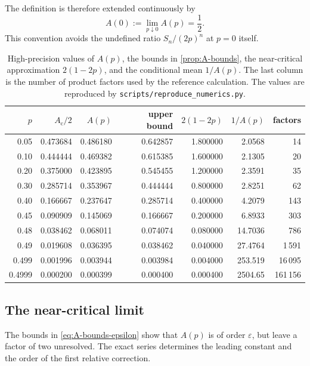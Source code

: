 The definition is therefore extended continuously by
\begin{equation}
  A(0):=\lim_{p\downarrow0}A(p)=\frac12.
  \label{eq:A-at-zero}
\end{equation}
This convention avoids the undefined ratio \(S_n/(2p)^n\) at \(p=0\) itself.

\begin{table}[htbp]
\centering
\caption{High-precision values of \(A(p)\), the bounds in
\cref{prop:A-bounds}, the near-critical approximation \(2(1-2p)\), and the
conditional mean \(1/A(p)\).  The last column is the number of product factors used
by the reference calculation.  The values are reproduced by
\texttt{scripts/reproduce\_numerics.py}.}
\label{tab:A-values}
\small
\setlength{\tabcolsep}{4.2pt}
\begin{tabular}{@{}rrrrrrr@{}}
\toprule
\(p\) & \(A_{\mathrm c}/2\) & \(A(p)\) & upper bound & \(2(1-2p)\) & \(1/A(p)\) & factors\\
\midrule
0.05   & 0.473684 & 0.486180 & 0.642857 & 1.800000 & 2.0568 & 14\\
0.10   & 0.444444 & 0.469382 & 0.615385 & 1.600000 & 2.1305 & 20\\
0.20   & 0.375000 & 0.423895 & 0.545455 & 1.200000 & 2.3591 & 35\\
0.30   & 0.285714 & 0.353967 & 0.444444 & 0.800000 & 2.8251 & 62\\
0.40   & 0.166667 & 0.237647 & 0.285714 & 0.400000 & 4.2079 & 143\\
0.45   & 0.090909 & 0.145069 & 0.166667 & 0.200000 & 6.8933 & 303\\
0.48   & 0.038462 & 0.068011 & 0.074074 & 0.080000 & 14.7036 & 786\\
0.49   & 0.019608 & 0.036395 & 0.038462 & 0.040000 & 27.4764 & 1\,591\\
0.499  & 0.001996 & 0.003944 & 0.003984 & 0.004000 & 253.519 & 16\,095\\
0.4999 & 0.000200 & 0.000399 & 0.000400 & 0.000400 & 2504.65 & 161\,156\\
\bottomrule
\end{tabular}
\end{table}

\subsection{The near-critical limit}
\label{sec:A-near-critical}

The bounds in \cref{eq:A-bounds-epsilon} show that \(A(p)\) is of order
\(\varepsilon\), but leave a factor of two unresolved.  The exact series determines
the leading constant and the order of the first relative correction.

